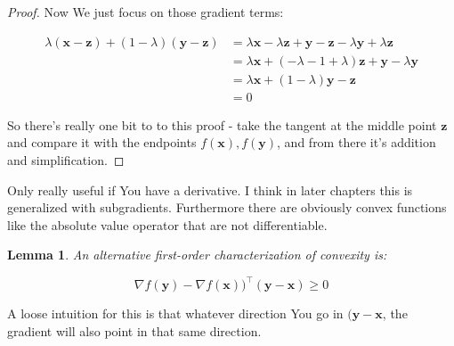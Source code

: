 \documentclass{article}
\newtheorem{lemma}[theorem]{Lemma}
\begin{document}
\begin{proof}
			Now We just focus on those gradient terms:
			
			\begin{align*}
				 \lambda (\mathbf{x-z}) + (1-\lambda)(\mathbf{y-z}) &= \lambda\mathbf{x} - \lambda\mathbf{z} + \mathbf{y-z} - \lambda\mathbf{y}+\lambda\mathbf{z}\\
				&= \lambda\mathbf{x} + (-\lambda - 1 + \lambda)\mathbf{z} + \mathbf{y} - \lambda\mathbf{y}\\
				&= \lambda\mathbf{x} + (1-\lambda)\mathbf{y} -\mathbf{z} \\
				&= 0
			\end{align*}
			
			So there's really one bit to to this proof - take the tangent at the middle point $\mathbf{z}$ and compare it with the endpoints $f(\mathbf{x}), f(\mathbf{y})$, and from there it's addition and simplification.
		\end{proof}
		
		Only really useful if You have a derivative. I think in later chapters this is generalized with subgradients. Furthermore there are obviously convex functions like the absolute value operator that are not differentiable.
		
		\begin{lemma}
			An alternative first-order characterization of convexity is:
			
			\[ \nabla f(\mathbf{y}) - \nabla f(\mathbf{x}))^\top (\mathbf{y-x}) \ge 0 \]
		\end{lemma}
		
		A loose intuition for this is that whatever direction You go in $(\mathbf{y-x}$, the gradient will also point in that same direction.
		
\end{document}
